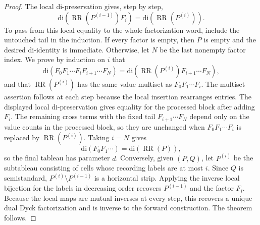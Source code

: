 \documentclass[10pt,a4paper]{amsart}
\newcommand{\di}{\mathrm{di}}
\begin{document}
\begin{proof}
The local \(\di\)-preservation gives, step by step,
\[
  \di(\operatorname{RR}(P^{(i-1)})F_i)
  =
  \di(\operatorname{RR}(P^{(i)})).
\]
To pass from this local equality to the whole factorization word, include the
untouched tail in the induction.  If every factor is empty, then \(P\) is empty
and the desired \(\di\)-identity is immediate.  Otherwise, let \(N\) be the last
nonempty factor index.
We prove by induction on \(i\) that
\[
  \di(F_0F_1\cdots F_iF_{i+1}\cdots F_N)
  =
  \di(\operatorname{RR}(P^{(i)})F_{i+1}\cdots F_N),
\]
and that \(\operatorname{RR}(P^{(i)})\) has the same value multiset as
\(F_0F_1\cdots F_i\).  The multiset assertion follows at each step because
the local insertion rearranges entries.  The displayed local
\(\di\)-preservation gives equality for the processed block after adding
\(F_i\).  The remaining cross terms with the fixed tail
\(F_{i+1}\cdots F_N\) depend only on the value counts in the processed block,
so they are unchanged when \(F_0F_1\cdots F_i\) is replaced by
\(\operatorname{RR}(P^{(i)})\).  Taking \(i=N\) gives
\[
  \di(F_0F_1\cdots)=\di(\operatorname{RR}(P)),
\]
so the final tableau has parameter \(d\).
Conversely, given \((P,Q)\), let \(P^{(i)}\) be the subtableau consisting of
cells whose recording labels are at most \(i\).  Since \(Q\) is semistandard,
\(P^{(i)}\setminus P^{(i-1)}\) is a horizontal strip.  Applying the inverse
local bijection for the labels in decreasing order recovers \(P^{(i-1)}\) and
the factor \(F_i\).  Because the local maps are mutual inverses at every step,
this recovers a unique dual Dyck factorization and is inverse to the forward
construction.  The theorem follows.
\end{proof}
\end{document}
